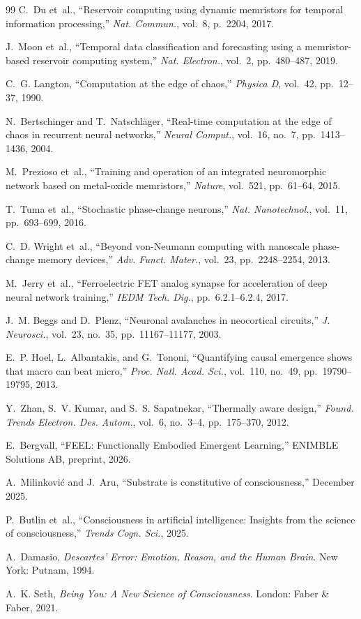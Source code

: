 \documentclass[11pt]{article}
\begin{document}
\begin{thebibliography}{99}
C.~Du et~al., ``Reservoir computing using dynamic memristors for
temporal information processing,''
\textit{Nat. Commun.}, vol.~8, p.~2204, 2017.

J.~Moon et~al., ``Temporal data classification and forecasting
using a memristor-based reservoir computing system,''
\textit{Nat. Electron.}, vol.~2, pp.~480--487, 2019.

C.~G. Langton, ``Computation at the edge of chaos,''
\textit{Physica D}, vol.~42, pp.~12--37, 1990.

N.~Bertschinger and T.~Natschl{\"a}ger,
``Real-time computation at the edge of chaos in recurrent neural
networks,''
\textit{Neural Comput.}, vol.~16, no.~7, pp.~1413--1436, 2004.

M.~Prezioso et~al., ``Training and operation of an integrated
neuromorphic network based on metal-oxide memristors,''
\textit{Nature}, vol.~521, pp.~61--64, 2015.

T.~Tuma et~al., ``Stochastic phase-change neurons,''
\textit{Nat. Nanotechnol.}, vol.~11, pp.~693--699, 2016.

C.~D. Wright et~al., ``Beyond von-Neumann computing with
nanoscale phase-change memory devices,''
\textit{Adv. Funct. Mater.}, vol.~23, pp.~2248--2254, 2013.

M.~Jerry et~al., ``Ferroelectric FET analog synapse for
acceleration of deep neural network training,''
\textit{IEDM Tech. Dig.}, pp.~6.2.1--6.2.4, 2017.

J.~M. Beggs and D.~Plenz, ``Neuronal avalanches in neocortical
circuits,''
\textit{J. Neurosci.}, vol.~23, no.~35, pp.~11167--11177, 2003.

E.~P. Hoel, L.~Albantakis, and G.~Tononi,
``Quantifying causal emergence shows that macro can beat micro,''
\textit{Proc. Natl. Acad. Sci.}, vol.~110, no.~49,
pp.~19790--19795, 2013.

Y.~Zhan, S.~V. Kumar, and S.~S. Sapatnekar,
``Thermally aware design,''
\textit{Found. Trends Electron. Des. Autom.}, vol.~6,
no.~3--4, pp.~175--370, 2012.

E.~Bergvall, ``FEEL: Functionally Embodied Emergent
Learning,'' ENIMBLE Solutions AB, preprint, 2026.

A.~Milinkovi{\'c} and J.~Aru,
``Substrate is constitutive of consciousness,''
December 2025.

P.~Butlin et~al., ``Consciousness in artificial intelligence:
Insights from the science of consciousness,''
\textit{Trends Cogn. Sci.}, 2025.

A.~Damasio, \textit{Descartes' Error: Emotion, Reason, and the
Human Brain}. New York: Putnam, 1994.

A.~K. Seth, \textit{Being You: A New Science of Consciousness}.
London: Faber \& Faber, 2021.

\end{thebibliography}
\end{document}
